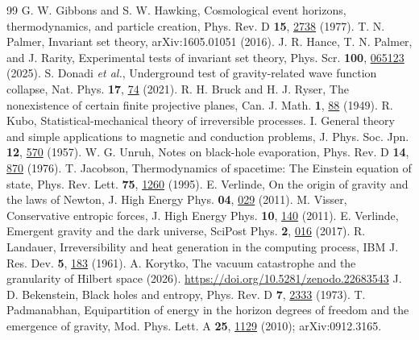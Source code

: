 \documentclass[aps,prd,twocolumn,superscriptaddress,nofootinbib,showkeys]{revtex4-2}
\begin{document}
\begin{thebibliography}{99}
 G. W. Gibbons and S. W. Hawking, Cosmological event horizons, thermodynamics, and particle creation, Phys. Rev. D \textbf{15}, \href{https://doi.org/10.1103/PhysRevD.15.2738}{2738} (1977).
 T. N. Palmer, Invariant set theory, arXiv:1605.01051 (2016).
 J. R. Hance, T. N. Palmer, and J. Rarity, Experimental tests of invariant set theory, Phys. Scr. \textbf{100}, \href{https://doi.org/10.1088/1402-4896/add9d7}{065123} (2025).
 S. Donadi \emph{et al.}, Underground test of gravity-related wave function collapse, Nat. Phys. \textbf{17}, \href{https://doi.org/10.1038/s41567-020-1008-4}{74} (2021).
 R. H. Bruck and H. J. Ryser, The nonexistence of certain finite projective planes, Can. J. Math. \textbf{1}, \href{https://doi.org/10.4153/CJM-1949-009-2}{88} (1949).
 R. Kubo, Statistical-mechanical theory of irreversible processes. I. General theory and simple applications to magnetic and conduction problems, J. Phys. Soc. Jpn. \textbf{12}, \href{https://doi.org/10.1143/JPSJ.12.570}{570} (1957).
 W. G. Unruh, Notes on black-hole evaporation, Phys. Rev. D \textbf{14}, \href{https://doi.org/10.1103/PhysRevD.14.870}{870} (1976).
 T. Jacobson, Thermodynamics of spacetime: The Einstein equation of state, Phys. Rev. Lett. \textbf{75}, \href{https://doi.org/10.1103/PhysRevLett.75.1260}{1260} (1995).
 E. Verlinde, On the origin of gravity and the laws of Newton, J. High Energy Phys. \textbf{04}, \href{https://doi.org/10.1007/JHEP04(2011)029}{029} (2011).
 M. Visser, Conservative entropic forces, J. High Energy Phys. \textbf{10}, \href{https://doi.org/10.1007/JHEP10(2011)140}{140} (2011).
 E. Verlinde, Emergent gravity and the dark universe, SciPost Phys. \textbf{2}, \href{https://doi.org/10.21468/SciPostPhys.2.3.016}{016} (2017).
 R. Landauer, Irreversibility and heat generation in the computing process, IBM J. Res. Dev. \textbf{5}, \href{https://doi.org/10.1147/rd.53.0183}{183} (1961).
 A. Korytko, The vacuum catastrophe and the granularity of Hilbert space (2026). \url{https://doi.org/10.5281/zenodo.22683543}
 J. D. Bekenstein, Black holes and entropy, Phys. Rev. D \textbf{7}, \href{https://doi.org/10.1103/PhysRevD.7.2333}{2333} (1973).
 T. Padmanabhan, Equipartition of energy in the horizon degrees of freedom and the emergence of gravity, Mod. Phys. Lett. A \textbf{25}, \href{https://doi.org/10.1142/S021773231003313X}{1129} (2010); arXiv:0912.3165.

\end{thebibliography}
\end{document}

